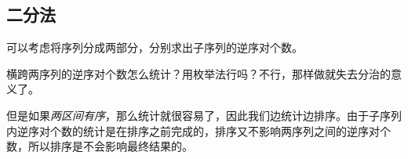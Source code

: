 \subsection{二分法}
	可以考虑将序列分成两部分，分别求出子序列的逆序对个数。
	
	横跨两序列的逆序对个数怎么统计？用枚举法行吗？不行，那样做就失去分治的意义了。
	
	但是如果\emph{两区间有序}，那么统计就很容易了，因此我们边统计边排序。由于子序列内逆序对个数的统计是在排序之前完成的，排序又不影响两序列之间的逆序对个数，所以排序是不会影响最终结果的。
	
	